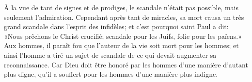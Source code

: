 À la vue de tant de signes et de prodiges, le scandale n’était pas possible,
	mais seulement l’admiration.
Cependant après tant de miracles,
	sa mort causa un très grand scandale dans l’esprit des infidèles;
	et c’est pourquoi saint Paul a dit:
	«Nous prêchons le Christ crucifié;
	scandale pour les Juifs, folie pour les païens.»
Aux hommes, il paraît fou que l’auteur de la vie soit mort pour les hommes;
	et ainsi l’homme a tiré un sujet de scandale
	de ce qui devait augmenter sa reconnaissance.
Car Dieu doit être honoré par les hommes d’une manière d’autant plus digne,
	qu’il a souffert pour les hommes d’une manière plus indigne.

